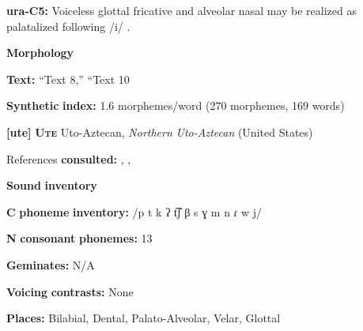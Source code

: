 \documentclass[output=paper]{langsci/langscibook}
\begin{document}
\begin{styleBody}
\textbf{ura-C5:} Voiceless glottal fricative and alveolar nasal may be realized as palatalized following /i/ \citep[47]{Olawsky2006}.
\end{styleBody}

\begin{styleBody}
\textbf{Morphology}
\end{styleBody}

\begin{styleBody}
\textbf{Text:} “Text 8,” “Text 10 \citep[902-905]{Olawsky2006}
\end{styleBody}

\begin{styleBody}
\textbf{Synthetic} \textbf{index:} 1.6 morphemes/word (270 morphemes, 169 words)
\end{styleBody}

\begin{styleBody}
\textbf{[ute]}   \textbf{\textsc{Ute}  }  Uto-Aztecan, \textit{Northern} \textit{Uto-Aztecan} (United States)
\end{styleBody}

\begin{styleBody}
References \textbf{consulted:} \citet{Givón2011}, \citet{Harms1966}, \citet{Oberly2013}
\end{styleBody}

\begin{styleBody}
\textbf{Sound} \textbf{inventory}
\end{styleBody}

\begin{styleBody}
\textbf{C} \textbf{phoneme} \textbf{inventory:} /p t k ʔ t͡ʃ β s ɣ m n ɾ w j/
\end{styleBody}

\begin{styleBody}
\textbf{N} \textbf{consonant} \textbf{phonemes:} 13
\end{styleBody}

\begin{styleBody}
\textbf{Geminates:} N/A
\end{styleBody}

\begin{styleBody}
\textbf{Voicing} \textbf{contrasts:} None
\end{styleBody}

\begin{styleBody}
\textbf{Places:} Bilabial, Dental, Palato-Alveolar, Velar, Glottal
\end{styleBody}
\end{document}
